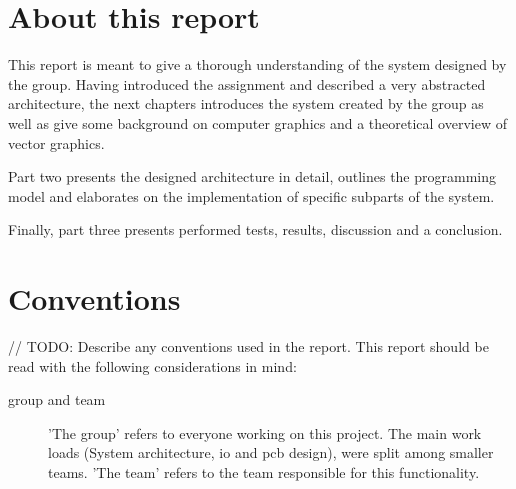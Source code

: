 \section{About this report}
This report is meant to give a thorough understanding of the system designed by the group.
Having introduced the assignment and described a very abstracted architecture, the next chapters introduces the system created by the group as well as give some background on computer graphics and a theoretical overview of vector graphics.

Part two presents the designed architecture in detail, outlines the programming model and elaborates on the implementation of specific subparts of the system.

Finally, part three presents performed tests, results, discussion and a conclusion.

\section{Conventions}
// TODO: Describe any conventions used in the report.
This report should be read with the following considerations in mind:

\begin{description}
    \item[group and team] 'The group' refers to everyone working on this project. The main work loads (System architecture, \gls{io} and \gls{pcb} design), were split among smaller teams. 'The team' refers to the team responsible for this functionality.
\end{description}
